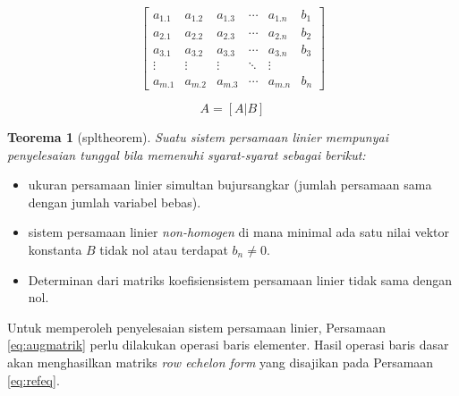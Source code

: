 \documentclass[
]{book}
\providecommand{\tightlist}{%
  \setlength{\itemsep}{0pt}\setlength{\parskip}{0pt}}
\newtheorem{theorem}{Teorema}[chapter]
\theoremstyle{definition}
\theoremstyle{definition}
\theoremstyle{definition}
\theoremstyle{definition}
\theoremstyle{remark}
\begin{document}
\begin{equation}
\begin{bmatrix}
     a_{1.1} & a_{1.2} & a_{1.3} &\cdots& a_{1.n} & b_1     \\[0.3em]
     a_{2.1} & a_{2.2} & a_{2.3} &\cdots& a_{2.n} & b_2     \\[0.3em]
     a_{3.1} & a_{3.2} & a_{3.3} &\cdots& a_{3.n} & b_3     \\[0.3em]
     \vdots  & \vdots  & \vdots &\ddots& \vdots            \\[0.3em]
     a_{m.1} & a_{m.2} & a_{m.3} &\cdots& a_{m.n} & b_n
     \end{bmatrix}
  \label{eq:augmatrik}
\end{equation}

\begin{equation}
A=\left[A|B\right]
  \label{eq:augmatrik2}
\end{equation}

\begin{theorem}[spltheorem]
\protect\hypertarget{thm:unnamed-chunk-134}{}\label{thm:unnamed-chunk-134}Suatu sistem persamaan linier mempunyai penyelesaian tunggal bila memenuhi syarat-syarat sebagai berikut:
\end{theorem}

\begin{itemize}
\tightlist
\item
  ukuran persamaan linier simultan bujursangkar (jumlah persamaan sama dengan jumlah variabel bebas).
\item
  sistem persamaan linier \emph{non-homogen} di mana minimal ada satu nilai vektor konstanta \(B\) tidak nol atau terdapat \(b_{n}\neq 0\).
\item
  Determinan dari matriks koefisiensistem persamaan linier tidak sama dengan nol.
\end{itemize}

Untuk memperoleh penyelesaian sistem persamaan linier, Persamaan \eqref{eq:augmatrik} perlu dilakukan operasi baris elementer. Hasil operasi baris dasar akan menghasilkan matriks \emph{row echelon form} yang disajikan pada Persamaan \eqref{eq:refeq}.
\end{document}
